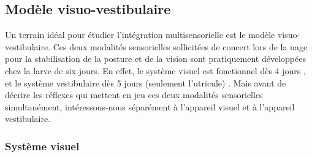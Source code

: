 





\subsection{Modèle visuo-vestibulaire}

Un terrain idéal pour étudier l'intégration multisensorielle est le modèle visuo-vestibulaire. Ces deux modalités sensorielles sollicitées de concert lors de la nage pour la stabilisation de la posture et de la vision sont pratiquement développées chez la larve de six jours. En effet, le système visuel est fonctionnel dès 4 jours \cite{bollmann_zebrafish_2019}, et le système vestibulaire dès 5 jours (seulement l'utricule) \cite{haddon_early_1996}. Mais avant de décrire les réflexes qui mettent en jeu ces deux modalités sensorielles simultanément, intéressons-nous séparément à l'appareil visuel et à l'appareil vestibulaire.

\subsubsection{Système visuel}

